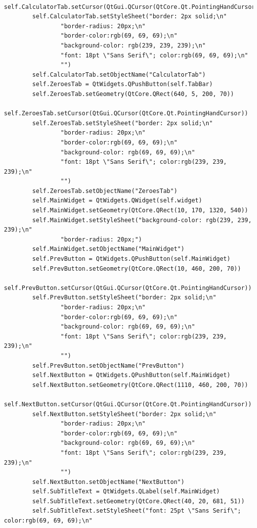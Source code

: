 \documentclass{article}
\begin{document}
\begin{lstlisting}
        self.CalculatorTab.setCursor(QtGui.QCursor(QtCore.Qt.PointingHandCursor))
        self.CalculatorTab.setStyleSheet("border: 2px solid;\n"
                "border-radius: 20px;\n"
                "border-color:rgb(69, 69, 69);\n"
                "background-color: rgb(239, 239, 239);\n"
                "font: 18pt \"Sans Serif\"; color:rgb(69, 69, 69);\n"
                "")
        self.CalculatorTab.setObjectName("CalculatorTab")
        self.ZeroesTab = QtWidgets.QPushButton(self.TabBar)
        self.ZeroesTab.setGeometry(QtCore.QRect(640, 5, 200, 70))
        self.ZeroesTab.setCursor(QtGui.QCursor(QtCore.Qt.PointingHandCursor))
        self.ZeroesTab.setStyleSheet("border: 2px solid;\n"
                "border-radius: 20px;\n"
                "border-color:rgb(69, 69, 69);\n"
                "background-color: rgb(69, 69, 69);\n"
                "font: 18pt \"Sans Serif\"; color:rgb(239, 239, 239);\n"
                "")
        self.ZeroesTab.setObjectName("ZeroesTab")
        self.MainWidget = QtWidgets.QWidget(self.widget)
        self.MainWidget.setGeometry(QtCore.QRect(10, 170, 1320, 540))
        self.MainWidget.setStyleSheet("background-color: rgb(239, 239, 239);\n"
                "border-radius: 20px;")
        self.MainWidget.setObjectName("MainWidget")
        self.PrevButton = QtWidgets.QPushButton(self.MainWidget)
        self.PrevButton.setGeometry(QtCore.QRect(10, 460, 200, 70))
        self.PrevButton.setCursor(QtGui.QCursor(QtCore.Qt.PointingHandCursor))
        self.PrevButton.setStyleSheet("border: 2px solid;\n"
                "border-radius: 20px;\n"
                "border-color:rgb(69, 69, 69);\n"
                "background-color: rgb(69, 69, 69);\n"
                "font: 18pt \"Sans Serif\"; color:rgb(239, 239, 239);\n"
                "")
        self.PrevButton.setObjectName("PrevButton")
        self.NextButton = QtWidgets.QPushButton(self.MainWidget)
        self.NextButton.setGeometry(QtCore.QRect(1110, 460, 200, 70))
        self.NextButton.setCursor(QtGui.QCursor(QtCore.Qt.PointingHandCursor))
        self.NextButton.setStyleSheet("border: 2px solid;\n"
                "border-radius: 20px;\n"
                "border-color:rgb(69, 69, 69);\n"
                "background-color: rgb(69, 69, 69);\n"
                "font: 18pt \"Sans Serif\"; color:rgb(239, 239, 239);\n"
                "")
        self.NextButton.setObjectName("NextButton")
        self.SubTitleText = QtWidgets.QLabel(self.MainWidget)
        self.SubTitleText.setGeometry(QtCore.QRect(40, 20, 681, 51))
        self.SubTitleText.setStyleSheet("font: 25pt \"Sans Serif\"; color:rgb(69, 69, 69);\n"

\end{lstlisting}
\end{document}
